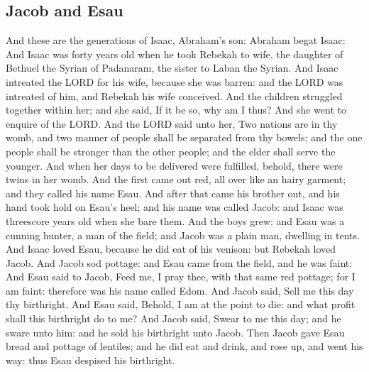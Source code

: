 \begin{biblechapter}
\section*{Jacob and Esau}
\verse And these are the generations of Isaac, Abraham's son: Abraham begat Isaac:
\verse And Isaac was forty years old when he took Rebekah to wife, the daughter of Bethuel the Syrian of Padanaram, the sister to Laban the Syrian.
\verse And Isaac intreated the LORD for his wife, because she was barren: and the LORD was intreated of him, and Rebekah his wife conceived.
\verse And the children struggled together within her; and she said, If it be so, why am I thus? And she went to enquire of the LORD.
\verse And the LORD said unto her, Two nations are in thy womb, and two manner of people shall be separated from thy bowels; and the one people shall be stronger than the other people; and the elder shall serve the younger.
\verse And when her days to be delivered were fulfilled, behold, there were twins in her womb.
\verse And the first came out red, all over like an hairy garment; and they called his name Esau.
\verse And after that came his brother out, and his hand took hold on Esau's heel; and his name was called Jacob: and Isaac was threescore years old when she bare them.
\verse And the boys grew: and Esau was a cunning hunter, a man of the field; and Jacob was a plain man, dwelling in tents.
\verse And Isaac loved Esau, because he did eat of his venison: but Rebekah loved Jacob.
\verse And Jacob sod pottage: and Esau came from the field, and he was faint:
\verse And Esau said to Jacob, Feed me, I pray thee, with that same red pottage; for I am faint: therefore was his name called Edom.
\verse And Jacob said, Sell me this day thy birthright.
\verse And Esau said, Behold, I am at the point to die: and what profit shall this birthright do to me?
\verse And Jacob said, Swear to me this day; and he sware unto him: and he sold his birthright unto Jacob.
\verse Then Jacob gave Esau bread and pottage of lentiles; and he did eat and drink, and rose up, and went his way: thus Esau despised his birthright.
\end{biblechapter}

